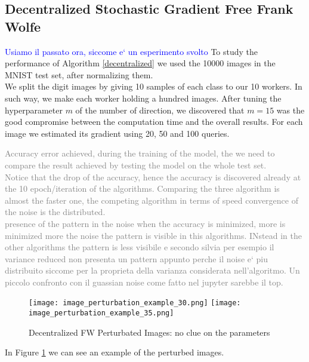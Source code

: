 \subsection{Decentralized Stochastic Gradient Free Frank Wolfe}
\textcolor{blue}{Usiamo il passato ora, siccome e` un esperimento svolto}
To study the performance of Algorithm \ref{decentralized} we used the 10000 images in the MNIST test set, after normalizing them.\\ We split the digit images by giving 10 samples of each class to our 10 workers. In such way, we make each worker holding a hundred images. After tuning the hyperparameter $m$ of the number of direction, we discovered that $m=15$ was the good compromise between the computation time and the overall results. For each image we estimated its gradient using 20, 50 and 100 queries.

\textcolor{gray}{Accuracy error achieved, during the training of the model, the we need to compare the result achieved by testing the model on the whole test set.\\ Notice that the drop of the accuracy, hence the accuracy is discovered already at the 10 epoch/iteration of the algorithms. Comparing the three algorithm is almost the faster one, the competing algorithm in terms of speed convergence of the noise is the distributed.
\\ presence of the pattern in the noise when the accuracy is minimized, more is minimized more the noise the pattern is visible in this algorithms. INstead in the other algorithms the pattern is less visibile e secondo silvia per esempio il variance reduced non presenta un pattern appunto perche il noise e` piu distribuito siccome per la proprieta della varianza considerata nell'algoritmo.
Un piccolo confronto con il guassian noise come fatto nel jupyter sarebbe il top.
}
\begin{figure}[htbp]
	\centering
	\texttt{[image: image\_perturbation\_example\_30.png]}\hfil
	\texttt{[image: image\_perturbation\_example\_35.png]}
	\caption{Decentralized FW Perturbated Images: no clue on the parameters}
	\label{fig:decentralized}
\end{figure}
In Figure \ref{fig:decentralized} we can see an example of the perturbed images.

